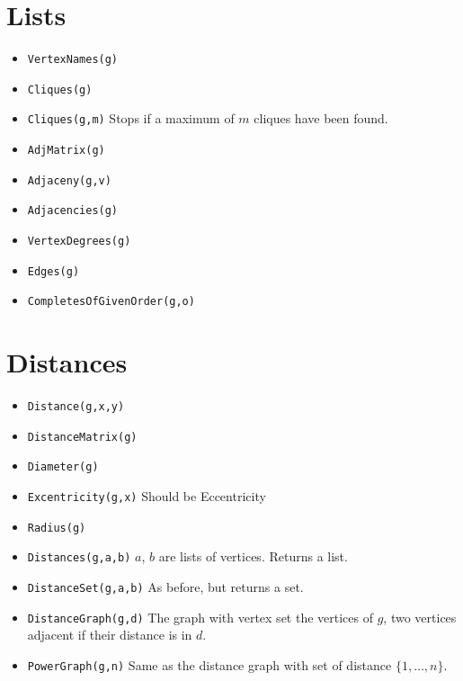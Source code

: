 \documentclass[11pt]{article}
\begin{document}
\begin{multicols}{3}
\section{Lists}
\label{sec:orgheadline10}
\begin{itemize}
\item \texttt{VertexNames(g)}
\item \texttt{Cliques(g)}
\item \texttt{Cliques(g,m)} Stops if a maximum of \(m\) cliques have been found.
\item \texttt{AdjMatrix(g)}
\item \texttt{Adjaceny(g,v)}
\item \texttt{Adjacencies(g)}
\item \texttt{VertexDegrees(g)}
\item \texttt{Edges(g)}
\item \texttt{CompletesOfGivenOrder(g,o)}
\end{itemize}

\section{Distances}
\label{sec:orgheadline11}
\begin{itemize}
\item \texttt{Distance(g,x,y)}
\item \texttt{DistanceMatrix(g)}
\item \texttt{Diameter(g)}
\item \texttt{Excentricity(g,x)} Should be Eccentricity
\item \texttt{Radius(g)}
\item \texttt{Distances(g,a,b)} \(a\), \(b\) are lists of vertices. Returns a list.
\item \texttt{DistanceSet(g,a,b)} As before, but returns a set.
\item \texttt{DistanceGraph(g,d)} The graph with vertex set the vertices of
\(g\), two vertices adjacent if their distance is in \(d\).
\item \texttt{PowerGraph(g,n)} Same as the distance graph with set of distance
\(\{1,\ldots,n\}\).
\end{itemize}

\end{multicols}
\end{document}

